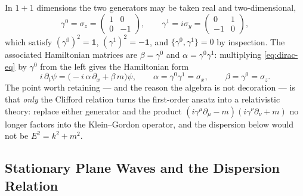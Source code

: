 In $1+1$ dimensions the two generators may be taken real and two-dimensional,
\begin{equation}
\gamma^{0} = \sigma_z =
\begin{pmatrix} 1 & 0 \\ 0 & -1 \end{pmatrix},
\qquad
\gamma^{1} = i\sigma_y =
\begin{pmatrix} 0 & 1 \\ -1 & 0 \end{pmatrix},
\label{eq:dirac-11rep}
\end{equation}
which satisfy $\left(\gamma^{0}\right)^{2} = \mathbf{1}$,
$\left(\gamma^{1}\right)^{2} = -\mathbf{1}$, and
$\{\gamma^{0},\gamma^{1}\} = 0$ by inspection. The associated Hamiltonian
matrices are $\beta = \gamma^{0}$ and
$\alpha = \gamma^{0}\gamma^{1}$: multiplying
\eqref{eq:dirac-eq} by $\gamma^{0}$ from the left gives the Hamiltonian form
\begin{equation}
i\,\partial_t \psi = \bigl(-i\,\alpha\,\partial_x + \beta\, m\bigr)\psi,
\qquad
\alpha = \gamma^{0}\gamma^{1} = \sigma_x,
\qquad
\beta = \gamma^{0} = \sigma_z .
\label{eq:dirac-hamiltonian}
\end{equation}
The point worth retaining --- and the reason the algebra is not decoration
--- is that \emph{only} the Clifford relation turns the first-order ansatz
into a relativistic theory: replace either generator and the product
$(i\gamma^{\mu}\partial_{\mu}-m)(i\gamma^{\nu}\partial_{\nu}+m)$ no longer
factors into the Klein--Gordon operator, and the dispersion below would not
be $E^{2} = k^{2} + m^{2}$.

\subsection{Stationary Plane Waves and the Dispersion Relation}
\label{sec:dirac-planes}

